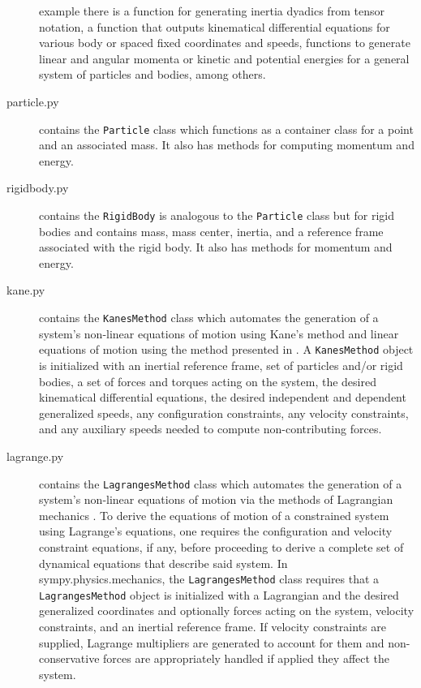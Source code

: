 \documentclass[twocolumn,10pt]{asme2e}
\begin{document}
\begin{description}
    example there is a function for generating inertia dyadics from tensor
    notation, a function that outputs kinematical differential equations for
    various body or spaced fixed coordinates and speeds, functions to generate
    linear and angular momenta or kinetic and potential energies for a general
    system of particles and bodies, among others.
  \item[particle.py] contains the \verb|Particle| class which functions as a
    container class for a point and an associated mass. It also has methods for
    computing momentum and energy.
  \item[rigidbody.py] contains the \verb|RigidBody| is analogous to the
    \verb|Particle| class but for rigid bodies and contains mass, mass center,
    inertia, and a reference frame associated with the rigid body. It also has
    methods for momentum and energy.
  \item[kane.py] contains the \verb|KanesMethod| class which automates the
    generation of a system's non-linear equations of motion using Kane's
    method\cite{Kane1985} and linear equations of motion using the method
    presented in \cite{Peterson2013}. A \verb|KanesMethod| object is initialized
    with an inertial reference frame, set of particles and/or rigid bodies, a
    set of forces and torques acting on the system, the desired kinematical
    differential equations, the desired independent and dependent generalized
    speeds, any configuration constraints, any velocity constraints, and any
    auxiliary speeds needed to compute non-contributing forces.
  \item[lagrange.py] contains the \verb|LagrangesMethod| class which automates
    the generation of a system's non-linear equations of motion via the methods
    of Lagrangian mechanics \cite{Crandall1968}. To derive the equations of
    motion of a constrained system using Lagrange's equations, one requires the
    configuration and velocity constraint equations, if any, before proceeding
    to derive a complete set of dynamical equations that describe said system.
    In sympy.physics.mechanics, the \verb|LagrangesMethod| class requires that
    a \verb|LagrangesMethod| object is initialized with a Lagrangian and the
    desired generalized coordinates and optionally forces acting on the system,
    velocity constraints, and an inertial reference frame. If velocity
    constraints are supplied, Lagrange multipliers are generated to account for
    them and non-conservative forces are appropriately handled if applied they
    affect the system.


\end{description}
\end{document}
